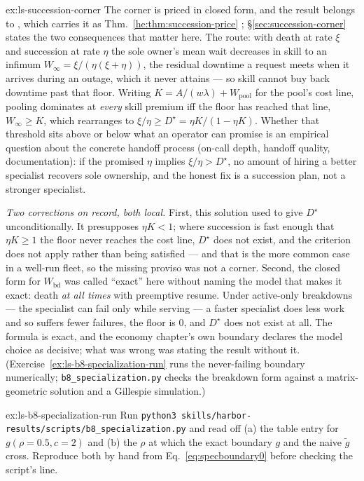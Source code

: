 \documentclass[11pt,a4paper]{article}
\theoremstyle{definition}
\theoremstyle{plain}
\begin{document}
\begin{pdsolution}{ex:ls-succession-corner}
The corner is priced in closed form, and the result belongs to
%
\ifpdbook
, which carries it as Thm.~\ref{he:thm:succession-price}%
\fi
; \S\ref{sec:succession-corner} states the two consequences that matter here.
The route: with death at rate $\xi$ and succession at rate $\eta$ the sole
owner's mean wait decreases in skill to an infimum
$W_\infty=\xi/(\eta(\xi+\eta))$, the residual downtime a request meets when it
arrives during an outage, which it never attains --- so skill cannot buy back
downtime past that floor. Writing $K=A/(w\lambda)+W_{\mathrm{pool}}$ for the
pool's cost line, pooling dominates at \emph{every} skill premium iff the floor
has reached that line, $W_\infty\ge K$, which rearranges to
$\xi/\eta\ge D^\star=\eta K/(1-\eta K)$. Whether that threshold sits above or
below what an operator can promise is an empirical question about the concrete
handoff process (on-call depth, handoff quality, documentation): if the
promised $\eta$ implies $\xi/\eta>D^\star$, no amount of hiring a better
specialist recovers sole ownership, and the honest fix is a succession plan,
not a stronger specialist.

\emph{Two corrections on record, both local.} First, this solution used to give
$D^\star$ unconditionally. It presupposes $\eta K<1$; where succession is fast
enough that $\eta K\ge1$ the floor never reaches the cost line, $D^\star$ does
not exist, and the criterion does not apply rather than being satisfied --- and
that is the more common case in a well-run fleet, so the missing proviso was
not a corner. Second, the closed form for $W_{\mathrm{bd}}$ was called
``exact'' here without naming the model that makes it exact: death \emph{at all
times} with preemptive resume. Under active-only breakdowns --- the specialist
can fail only while serving --- a faster specialist does less work and so
suffers fewer failures, the floor is $0$, and $D^\star$ does not exist at all.
The formula is exact, and the economy chapter's own boundary declares the model
choice as decisive; what was wrong was stating the result without it.
(Exercise~\ref{ex:ls-b8-specialization-run} runs the never-failing boundary
numerically; \texttt{b8\_specialization.py} checks the breakdown form against a
matrix-geometric solution and a Gillespie simulation.)
\end{pdsolution}
\begin{pdexercise}[kind=Trace,rating=2]{ex:ls-b8-specialization-run}
Run \texttt{python3 skills/harbor-results/scripts/b8\_specialization.py} and read off
(a) the table entry for $g(\rho{=}0.5,c{=}2)$ and (b) the $\rho$ at which the exact
boundary $g$ and the naive $\tilde g$ cross. Reproduce both by hand from
Eq.~\ref{eq:specboundary0} before checking the script's line.
\end{pdexercise}
\end{document}

